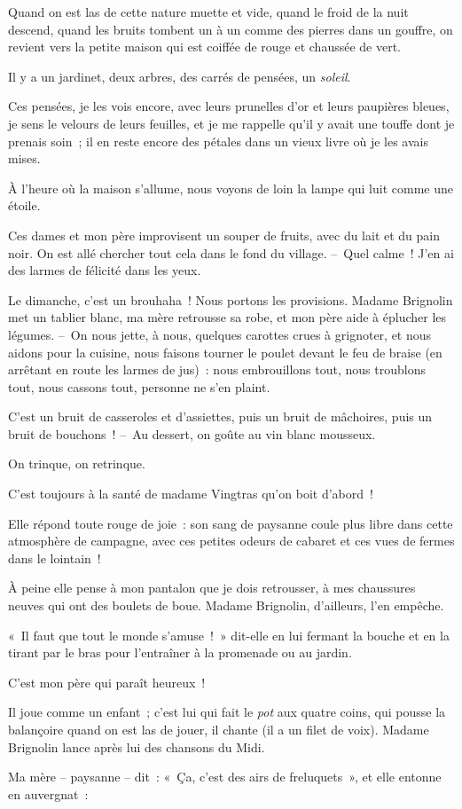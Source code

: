 \documentclass[french,twoside]{book} %
\begin{document}
Quand on est las de cette nature muette et vide, quand le froid de la nuit descend, quand les bruits tombent un à un comme des pierres dans un gouffre, on revient vers la petite maison qui est coiffée de rouge et chaussée de vert.\par
Il y a un jardinet, deux arbres, des carrés de pensées, un \emph{soleil}.\par
Ces pensées, je les vois encore, avec leurs prunelles d’or et leurs paupières bleues, je sens le velours de leurs feuilles, et je me rappelle qu’il y avait une touffe dont je prenais soin ; il en reste encore des pétales dans un vieux livre où je les avais mises.\par
À l’heure où la maison s’allume, nous voyons de loin la lampe qui luit comme une étoile.\par
Ces dames et mon père improvisent un souper de fruits, avec du lait et du pain noir. On est allé chercher tout cela dans le fond du village. – Quel calme ! J’en ai des larmes de félicité dans les yeux.\par
\bigbreak
\noindent Le dimanche, c’est un brouhaha ! Nous portons les provisions. Madame Brignolin met un tablier blanc, ma mère retrousse sa robe, et mon père aide à éplucher les légumes. – On nous jette, à nous, quelques carottes crues à grignoter, et nous aidons pour la cuisine, nous faisons tourner le poulet devant le feu de braise (en arrêtant en route les larmes de jus) : nous embrouillons tout, nous troublons tout, nous cassons tout, personne ne s’en plaint.\par
C’est un bruit de casseroles et d’assiettes, puis un bruit de mâchoires, puis un bruit de bouchons ! – Au dessert, on goûte au vin blanc mousseux.\par
On trinque, on retrinque.\par
C’est toujours à la santé de madame Vingtras qu’on boit d’abord !\par
Elle répond toute rouge de joie : son sang de paysanne coule plus libre dans cette atmosphère de campagne, avec ces petites odeurs de cabaret et ces vues de fermes dans le lointain !\par
À peine elle pense à mon pantalon que je dois retrousser, à mes chaussures neuves qui ont des boulets de boue. Madame Brignolin, d’ailleurs, l’en empêche.\par
« Il faut que tout le monde s’amuse ! » dit-elle en lui fermant la bouche et en la tirant par le bras pour l’entraîner à la promenade ou au jardin.\par
C’est mon père qui paraît heureux !\par
Il joue comme un enfant ; c’est lui qui fait le \emph{pot} aux quatre coins, qui pousse la balançoire quand on est las de jouer, il chante (il a un filet de voix). Madame Brignolin lance après lui des chansons du Midi.\par
Ma mère – paysanne – dit : « Ça, c’est des airs de freluquets », et elle entonne en auvergnat :\par
\end{document}
